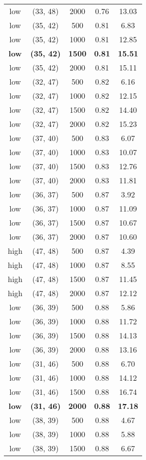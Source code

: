 \begin{tabular}{c c c c c}
low & (33, 48) &  2000 & 0.76 & 13.03 \\
low & (35, 42) &  500 & 0.81 & 6.83 \\
low & (35, 42) &  1000 & 0.81 & 12.85 \\
\textbf{low} & \textbf{(35, 42)} & \textbf{ 1500} & \textbf{0.81} & \textbf{15.51} \\
low & (35, 42) &  2000 & 0.81 & 15.11 \\
low & (32, 47) &  500 & 0.82 & 6.16 \\
low & (32, 47) &  1000 & 0.82 & 12.15 \\
low & (32, 47) &  1500 & 0.82 & 14.40 \\
low & (32, 47) &  2000 & 0.82 & 15.23 \\
low & (37, 40) &  500 & 0.83 & 6.07 \\
low & (37, 40) &  1000 & 0.83 & 10.07 \\
low & (37, 40) &  1500 & 0.83 & 12.76 \\
low & (37, 40) &  2000 & 0.83 & 11.81 \\
low & (36, 37) &  500 & 0.87 & 3.92 \\
low & (36, 37) &  1000 & 0.87 & 11.09 \\
low & (36, 37) &  1500 & 0.87 & 10.67 \\
low & (36, 37) &  2000 & 0.87 & 10.60 \\
high & (47, 48) &  500 & 0.87 & 4.39 \\
high & (47, 48) &  1000 & 0.87 & 8.55 \\
high & (47, 48) &  1500 & 0.87 & 11.45 \\
high & (47, 48) &  2000 & 0.87 & 12.12 \\
low & (36, 39) &  500 & 0.88 & 5.86 \\
low & (36, 39) &  1000 & 0.88 & 11.72 \\
low & (36, 39) &  1500 & 0.88 & 14.13 \\
low & (36, 39) &  2000 & 0.88 & 13.16 \\
low & (31, 46) &  500 & 0.88 & 6.70 \\
low & (31, 46) &  1000 & 0.88 & 14.12 \\
low & (31, 46) &  1500 & 0.88 & 16.74 \\
\textbf{low} & \textbf{(31, 46)} & \textbf{ 2000} & \textbf{0.88} & \textbf{17.18} \\
low & (38, 39) &  500 & 0.88 & 4.67 \\
low & (38, 39) &  1000 & 0.88 & 5.88 \\
low & (38, 39) &  1500 & 0.88 & 6.67 \\

\end{tabular}
